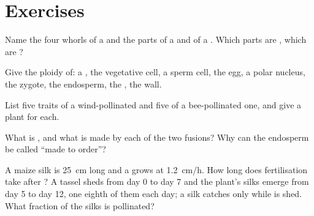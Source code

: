 \section{Exercises}

\begin{exercise}[$\star$]\label{exo:b2:angiosperm-reproduction:1}
Name the four whorls of a  and the parts of a  and of a
. Which parts are  , which are 
?
\end{exercise}

\begin{exercise}[$\star$]\label{exo:b2:angiosperm-reproduction:2}
Give the ploidy of: a , the vegetative cell, a sperm cell,
the egg, a polar nucleus, the zygote, the endosperm, the ,
the  wall.
\end{exercise}

\begin{exercise}[$\star$]\label{exo:b2:angiosperm-reproduction:3}
List five traits of a wind-pollinated  and five of a
bee-pollinated one, and give a plant for each.
\end{exercise}

\begin{exercise}[$\star$]\label{exo:b2:angiosperm-reproduction:4}
What is , and what is made by each of the two
fusions? Why can the endosperm be called ``made to order''?
\end{exercise}

\begin{exercise}[$\star\star$]\label{exo:b2:angiosperm-reproduction:5}
A maize silk is \qty{25}{cm} long and a  grows at
\qty{1.2}{cm/h}. How long does fertilisation take after ?
A tassel sheds  from day 0 to day 7 and the plant's silks
emerge from day 5 to day 12, one eighth of them each day; a silk
catches  only while  is shed. What fraction of the
silks is pollinated?
\end{exercise}

